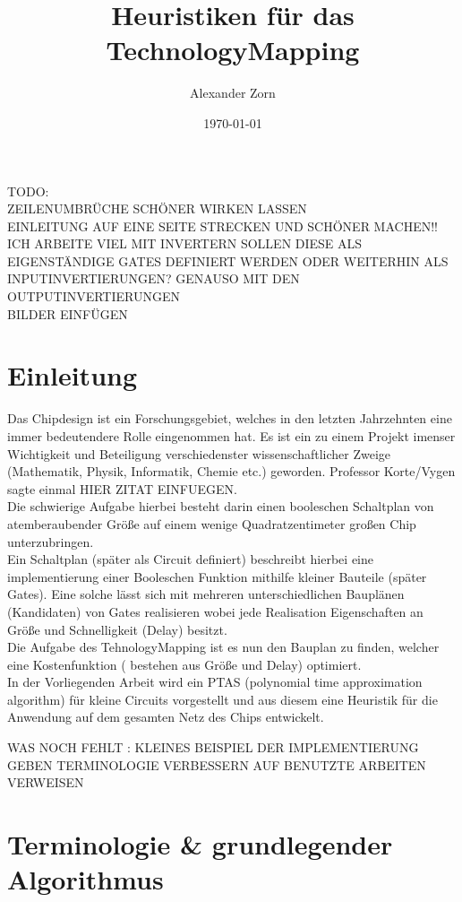 \documentclass[11pt, a4paper, german]{article}
\author{Alexander Zorn}
\date{\today}
\title{Heuristiken f\"ur das TechnologyMapping}
\newcommand{\TM}{TehnologyMapping }
\begin{document}
\maketitle

\tableofcontents
\newpage

TODO: \\
ZEILENUMBRÜCHE SCHÖNER WIRKEN LASSEN\\
EINLEITUNG AUF EINE SEITE STRECKEN UND SCHÖNER MACHEN!!\\
ICH ARBEITE VIEL MIT INVERTERN SOLLEN DIESE ALS EIGENSTÄNDIGE GATES DEFINIERT WERDEN ODER WEITERHIN ALS INPUTINVERTIERUNGEN? GENAUSO MIT DEN OUTPUTINVERTIERUNGEN\\
BILDER EINFÜGEN


\section{Einleitung}


Das Chipdesign ist ein Forschungsgebiet, welches in den letzten Jahrzehnten eine immer bedeutendere Rolle eingenommen hat. Es ist ein zu einem Projekt imenser Wichtigkeit und Beteiligung verschiedenster wissenschaftlicher Zweige (Mathematik, Physik, Informatik, Chemie etc.) geworden. 
Professor Korte/Vygen sagte einmal HIER ZITAT EINFUEGEN. \\
Die schwierige Aufgabe hierbei besteht darin einen booleschen Schaltplan von atemberaubender Größe auf einem wenige Quadratzentimeter großen Chip unterzubringen.  \\
Ein Schaltplan (später als Circuit definiert) beschreibt hierbei eine implementierung einer Booleschen Funktion mithilfe kleiner Bauteile (später Gates). Eine solche lässt sich mit mehreren unterschiedlichen Bauplänen (Kandidaten) von Gates realisieren wobei jede Realisation Eigenschaften an Größe und Schnelligkeit (Delay) besitzt. \\
Die Aufgabe des \TM  ist es nun den Bauplan zu finden, welcher eine Kostenfunktion ( bestehen aus Größe und Delay) optimiert. \\
In der Vorliegenden Arbeit wird ein PTAS (polynomial time approximation algorithm) für kleine Circuits vorgestellt und aus diesem eine Heuristik für die Anwendung auf dem gesamten Netz des Chips entwickelt.

WAS NOCH FEHLT : KLEINES BEISPIEL DER IMPLEMENTIERUNG GEBEN 
TERMINOLOGIE VERBESSERN 
AUF BENUTZTE ARBEITEN VERWEISEN

\section{Terminologie \& grundlegender Algorithmus}
\end{document}
